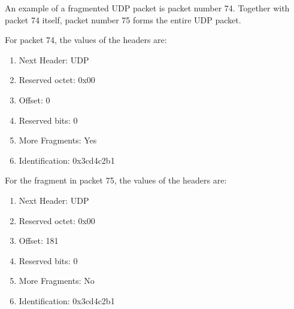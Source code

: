 An example of a fragmented UDP packet is packet number 74. Together with packet 74 itself, packet number 75 forms the entire UDP packet.

For packet 74, the values of the headers are:
\begin{enumerate}
	\item Next Header: UDP
	\item Reserved octet: 0x00
	\item Offset: 0
	\item Reserved bits: 0
	\item More Fragments: Yes
	\item Identification: 0x3cd4c2b1
\end{enumerate}

For the fragment in packet 75, the values of the headers are:
\begin{enumerate}
	\item Next Header: UDP
	\item Reserved octet: 0x00
	\item Offset: 181
	\item Reserved bits: 0
	\item More Fragments: No
	\item Identification: 0x3cd4c2b1
\end{enumerate}